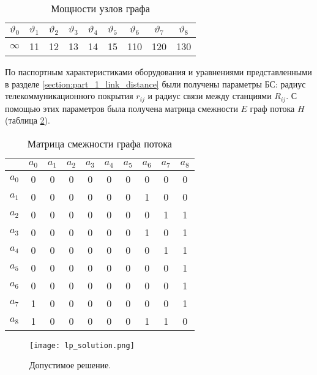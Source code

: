 \begin{table}[h!]\centering
\begin{tabular}{| c| c c c c c |c c c|}\hline
    $\vartheta_0$& $\vartheta_1$& $\vartheta_2$& $\vartheta_3$& $\vartheta_4$& $\vartheta_5$& $\vartheta_6$& $\vartheta_7$ & $\vartheta_8$\\
    \hline
    \hline
    $\infty$ & 11&	12&	13&	14&	15&	110& 120 & 130\\
    \hline
\end{tabular}\caption{Мощности узлов графа}\label{tab:part3_lp_intensity}
\end{table}
   

По паспортным характеристиками оборудования и уравнениями представленными в разделе \cref{section:part_1_link_distance} были получены параметры БС: радиус телекоммуникационного покрытия $r_{ij}$ и радиус связи между станциями $R_{ij}$. С помощью этих параметров была получена матрица смежности $E$ граф потока $H$ (таблица \cref{tab:part3_lp_adj_mat}).




\begin{table}[h!]\centering
\begin{tabular}{|c|| c| c c c c c| c c c|}\hline
    
    & $a_0$& $a_1$& $a_2$& $a_3$& $a_4$& $a_5$& $a_6$& $a_7$ & $a_8$\\
    \hline
    \hline
    $a_0$ & 0&	0&	0&	0&	0&	0&	0 &	0&	0\\
    \hline
    $a_1$ & 0&	0&	0&	0&	0&	0&	1 &	0&	0\\
    $a_2$ & 0&	0&	0&	0&	0&	0&	0 &	1&	1\\
    $a_3$ & 0&	0&	0&	0&	0&	0&	1 &	0&	1\\
    $a_4$ & 0&	0&	0&	0&	0&	0&	0 &	1&	1\\
    $a_5$ & 0&	0&	0&	0&	0&	0&	0 &	0&	1\\
    \hline
    $a_6$ & 0&	0&	0&	0&	0&	0&	0 &	0&	1\\
    $a_7$ & 1&	0&	0&	0&	0&	0&	0 &	0&	1\\
    $a_8$ & 1&	0&	0&	0&	0&	0&	1 &	1&	0\\
    \hline
\end{tabular}\caption{Матрица смежности графа потока}\label{tab:part3_lp_adj_mat}
\end{table}



\begin{figure}[h!]
    \centering
        \texttt{[image: lp\_solution.png]}
    \caption{Допустимое решение.}
    \label{fig:part3_lp_solution}
\end{figure}

